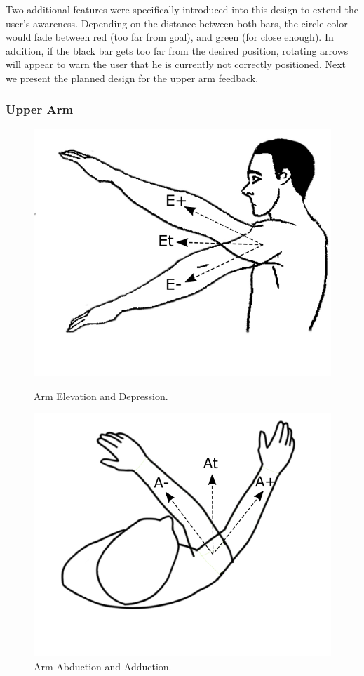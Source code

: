 Two additional features were specifically introduced into this design to extend the user's awareness. 
Depending on the distance between both bars, the circle color would fade between red (too far from goal), and green (for close enough). 
In addition, if the black bar gets too far from the desired position, rotating arrows will appear to warn the user that he is currently not correctly positioned. 
Next we present the planned design for the upper arm feedback.

\subsubsection{Upper Arm}


\begin{figure}[!t]
  \centering
  \includegraphics[width=0.8\linewidth]{imgs/approach/elevation_depression}
    \caption{Arm Elevation and Depression.}
    \label{fig:elevation_depression}
    \endminipage\hfill
{}
  \centering
  \includegraphics[width=0.8\linewidth]{imgs/approach/abduction_adduction}
    \caption{Arm Abduction and Adduction.}
    \label{fig:abduction_adduction}
    \endminipage
\end{figure}

